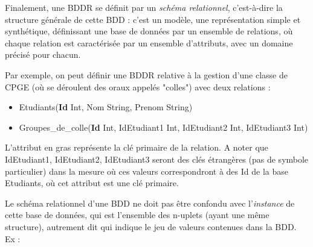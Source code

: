 \documentclass[french,11pt,twoside]{VcCours}
\begin{document}
% 
% 
% 

Finalement, une BDDR se définit par un \emph{schéma relationnel}, c'est-à-dire la structure générale de cette BDD : c'est un modèle, une représentation simple et synthétique, définissant une base de données par un ensemble de relations, où chaque relation est caractérisée par un ensemble d'attributs, avec un domaine précisé pour chacun. 

Par exemple, on peut définir une BDDR relative à la gestion d'une classe de CPGE (où se déroulent des oraux appelés "colles") avec deux relations :
\begin{itemize}
 \item Etudiants(\textbf{Id} Int, Nom String, Prenom String)
 \item Groupes\_de\_colle(\textbf{Id} Int, IdEtudiant1 Int, IdEtudiant2 Int, IdEtudiant3 Int)
\end{itemize}

L'attribut en gras représente la clé primaire de la relation. A noter que IdEtudiant1, IdEtudiant2, IdEtudiant3 seront des clés étrangères (pas de symbole particulier) dans la mesure où ces valeurs correspondront à des Id de la base Etudiants, où cet attribut est une clé primaire.

Le schéma relationnel d'une BDD ne doit pas être confondu avec l'\emph{instance} de cette base de données, qui est l'ensemble des n-uplets (ayant une même structure), autrement dit qui indique le jeu de valeurs contenues dans la BDD. Ex :
\end{document}
